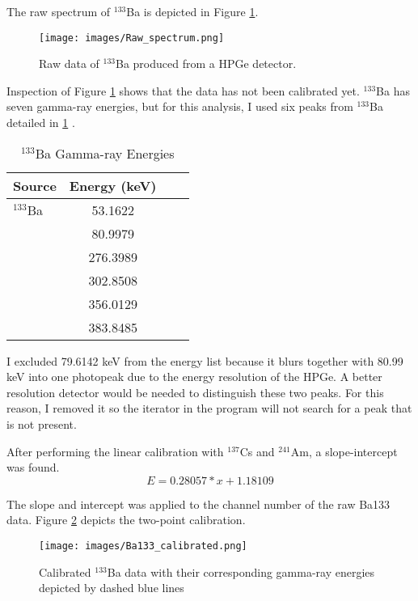 The raw spectrum of $^{133}$Ba is depicted in Figure \ref{fig:raw_data}.

\begin{figure}[H]
\centering
\texttt{[image: images/Raw\_spectrum.png]}
\caption{Raw data of $^{133}$Ba produced from a HPGe detector.}
\label{fig:raw_data}
\end{figure}

Inspection of Figure \ref{fig:raw_data} shows that the data has not been calibrated yet.
$^{133}$Ba has seven gamma-ray energies, but for this analysis, I used six peaks from $^{133}$Ba
detailed in \ref{table:energy} \cite{Untitled27:online}.

\begin{table}[H]
\caption{$^{133}$Ba Gamma-ray Energies}
\begin{center}
\begin{tabular}{l|c|c|r}
\textbf{Source} & \textbf{Energy (keV)}\\
\hline
$^{133}$Ba    &  53.1622 \\
              &  80.9979 \\
              &  276.3989 \\
              & 302.8508  \\
              & 356.0129 \\
              & 383.8485 \\
\end{tabular}
\end{center}
\label{table:energy}
\end{table}

I excluded 79.6142 keV from the energy list because it blurs together with
80.99 keV into one photopeak due to the energy resolution
of the HPGe. A better resolution detector would be needed to distinguish
these two peaks. For this reason, I removed it so the iterator in the program will
not search for a peak that is not present.

After performing the linear calibration with $^{137}$Cs and $^{241}$Am,
a slope-intercept was found.
\vspace{5mm} %
\begin{equation}
E = 0.28057*x + 1.18109
\end{equation}
\vspace{5mm} %

The slope and intercept was applied to the channel number of the raw Ba133 data.
Figure \ref{fig:CE} depicts the two-point calibration.

\begin{figure}[H]
\centering
\texttt{[image: images/Ba133\_calibrated.png]}
\caption{Calibrated $^{133}$Ba data with their corresponding gamma-ray energies
depicted by dashed blue lines}
\label{fig:CE}
\end{figure}
